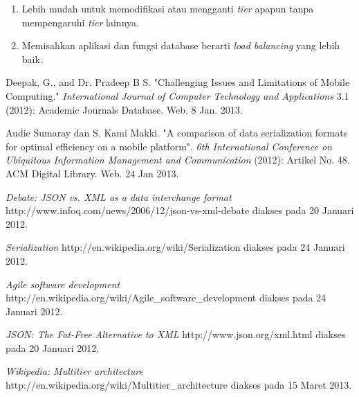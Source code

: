 \documentclass[a4paper, 12pt]{report}
\begin{document}
\begin{enumerate}
  \item Lebih mudah untuk memodifikasi atau mengganti \textit{tier} apapun tanpa mempengaruhi \textit{tier} lainnya.
  \item Memisahkan aplikasi dan fungsi database berarti \textit{load balancing} yang lebih baik.
\end{enumerate}

\begin{thebibliography}{99}
\singlespacing 


Deepak, G., and Dr. Pradeep B S. "Challenging Issues and Limitations of Mobile Computing."
  \emph{International Journal of Computer Technology and Applications} 3.1 (2012): Academic Journals Database. Web. 8 Jan. 2013.
  
Audie Sumaray dan S. Kami Makki. "A comparison of data serialization formats for optimal efficiency on a mobile platform". \emph{6th International Conference on Ubiquitous Information Management and Communication} (2012): Artikel No. 48. ACM Digital Library. Web. 24 Jan 2013.
  
  \emph{Debate: JSON vs. XML as a data interchange format}
  http://www.infoq.com/news/2006/12/json-vs-xml-debate
  diakses pada 20 Januari 2012.
  
  \emph{Serialization}
  http://en.wikipedia.org/wiki/Serialization
  diakses pada 24 Januari 2012.
  
  \emph{Agile software development}
  http://en.wikipedia.org/wiki/Agile\_software\_development
  diakses pada 24 Januari 2012.
  
  \emph{JSON: The Fat-Free Alternative to XML}
  http://www.json.org/xml.html
  diakses pada 20 Januari 2012.
  
  \emph{Wikipedia: Multitier architecture}
  http://en.wikipedia.org/wiki/Multitier\_architecture
  diakses pada 15 Maret 2013.
  

\end{thebibliography}
\end{document}
